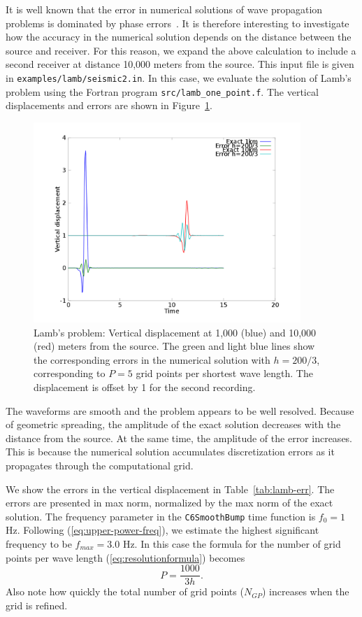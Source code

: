 \documentclass[11pt]{report}
\begin{document}
It is well known that the error in numerical solutions of wave propagation problems is dominated by
phase errors~\cite{Gustafsson-Kreiss-Oliger}. It is therefore interesting to investigate how the
accuracy in the numerical solution depends on the distance between the source and receiver. For this
reason, we expand the above calculation to include a second receiver at distance 10,000 meters from
the source. This input file is given in {\tt examples/lamb/seismic2.in}. In this case, we evaluate
the solution of Lamb's problem using the Fortran program {\tt src/lamb\_one\_point.f}. The vertical
displacements and errors are shown in Figure~\ref{fig:lambSAC}.
\begin{figure}[ht]
  \begin{center}
    \includegraphics[width=0.9\textwidth]{figures/lamb-err-h66.png}
    \caption{Lamb's problem: Vertical displacement at 1,000 (blue) and 10,000 (red) meters from the
      source. The green and light blue lines show the corresponding errors in the
      numerical solution with $h=200/3$, corresponding to $P=5$ grid points per shortest wave
      length. The displacement is offset by 1 for the second recording.}
    \label{fig:lambSAC}
  \end{center}
\end{figure}
The waveforms are smooth and the problem appears to be well resolved. Because of geometric
spreading, the amplitude of the exact solution decreases with the distance from the source. At the
same time, the amplitude of the error increases. This is because the numerical solution accumulates
discretization errors as it propagates through the computational grid.

We show the errors in the vertical displacement in Table~\ref{tab:lamb-err}. The errors are
presented in max norm, normalized by the max norm of the exact solution. The
frequency parameter in the {\tt C6SmoothBump} time function is $f_0=1$ Hz. Following
(\ref{eq:upper-power-freq}), we estimate the highest significant frequency to be $f_{max}=3.0$
Hz. In this case the formula for the number of grid points per wave length
(\ref{eq:resolutionformula}) becomes
\[
P=\frac{1000}{3 h}.
\]
Also note how quickly the total number of grid points ($N_{GP}$) increases when the grid is
refined. 
\end{document}
